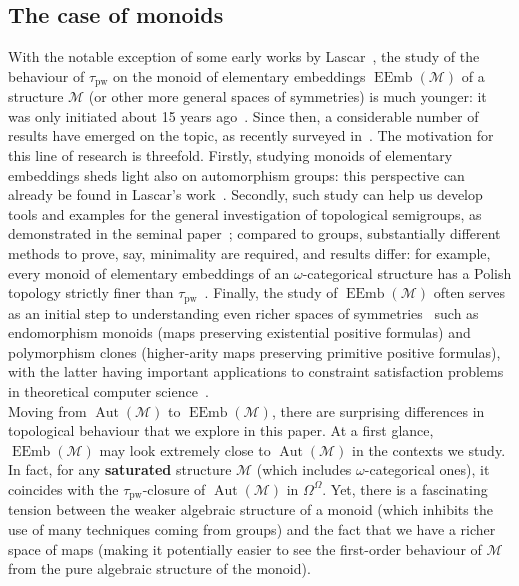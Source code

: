 \documentclass{article}
\theoremstyle{remark}
\theoremstyle{definition}
\DeclareMathOperator{\Aut}{Aut}
\DeclareMathOperator{\EEmb}{EEmb}
\newcommand{\M}[0]{\mathcal{M}}
\newcommand{\pw}[0]{\tau_{\mathrm{pw}}}
\begin{document}
\subsection{The case of monoids}

With the notable exception of some early works by Lascar~\cite{Lascar, Lascar82}, the study of the behaviour of $\pw$ on the monoid of elementary embeddings $\EEmb(\M)$ of a structure $\M$  (or other more general spaces of symmetries) is much younger: it was only initiated about 15 years ago~\cite{Reconstruction}. Since then, a considerable number of results have emerged on the topic, as recently surveyed in~\cite{marimon2025guide}. The motivation for this line of research is threefold. Firstly,  studying monoids of elementary embeddings sheds light also on automorphism groups: this perspective can already be found in Lascar's work~\cite{Lascar, Lascar82}. Secondly, such study can help us develop tools and examples for the general investigation of topological semigroups, as demonstrated in the seminal paper~\cite{elliott2023automatic}; compared to groups, substantially different methods to prove, say, minimality are required, and results differ: for example, every monoid of elementary embeddings of an $\omega$-categorical structure has a Polish topology strictly finer than $\pw$~\cite[Proposition~5.1]{elliott2023polish}. Finally, the study of $\EEmb(\M)$ often serves as an initial step to understanding even richer spaces of symmetries~\cite{bodirsky2015topological} such as endomorphism monoids (maps preserving existential positive  formulas) and polymorphism clones (higher-arity maps preserving primitive positive formulas), with the latter having important applications 
to constraint satisfaction problems in
theoretical computer science~\cite{BPP-projective-homomorphisms, RomanMichael}.\\



Moving from $\Aut(\M)$ to $\EEmb(\M)$, there are surprising differences in topological behaviour that we explore in this paper. At a first glance, $\EEmb(\M)$ may look extremely close to $\Aut(\M)$ in the contexts we study. In fact, for any \textbf{saturated} structure $\M$ (which includes $\omega$-categorical ones), it coincides with the $\pw$-closure of $\Aut(\M)$ in $\Omega^\Omega$. Yet, there is a fascinating tension between the weaker algebraic structure of a monoid (which inhibits the use of many  techniques coming from groups) and the fact that we have a  richer space of maps (making it potentially easier to see the first-order behaviour of $\M$ from the pure  algebraic structure of the monoid).\\
\end{document}
